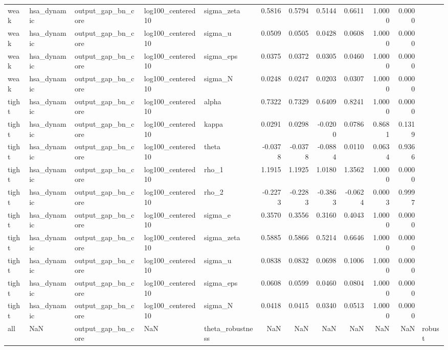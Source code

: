 \begin{tabular}{lllllrrrrrrl}
weak & hsa\_dynamic & output\_gap\_bn\_core & log100\_centered10 & sigma\_zeta & 0.5816 & 0.5794 & 0.5144 & 0.6611 & 1.0000 & 0.0000 &  \\
weak & hsa\_dynamic & output\_gap\_bn\_core & log100\_centered10 & sigma\_u & 0.0509 & 0.0505 & 0.0428 & 0.0608 & 1.0000 & 0.0000 &  \\
weak & hsa\_dynamic & output\_gap\_bn\_core & log100\_centered10 & sigma\_eps & 0.0375 & 0.0372 & 0.0305 & 0.0460 & 1.0000 & 0.0000 &  \\
weak & hsa\_dynamic & output\_gap\_bn\_core & log100\_centered10 & sigma\_N & 0.0248 & 0.0247 & 0.0203 & 0.0307 & 1.0000 & 0.0000 &  \\
tight & hsa\_dynamic & output\_gap\_bn\_core & log100\_centered10 & alpha & 0.7322 & 0.7329 & 0.6409 & 0.8241 & 1.0000 & 0.0000 &  \\
tight & hsa\_dynamic & output\_gap\_bn\_core & log100\_centered10 & kappa & 0.0291 & 0.0298 & -0.0200 & 0.0786 & 0.8681 & 0.1319 &  \\
tight & hsa\_dynamic & output\_gap\_bn\_core & log100\_centered10 & theta & -0.0378 & -0.0378 & -0.0884 & 0.0110 & 0.0634 & 0.9366 &  \\
tight & hsa\_dynamic & output\_gap\_bn\_core & log100\_centered10 & rho\_1 & 1.1915 & 1.1925 & 1.0180 & 1.3562 & 1.0000 & 0.0000 &  \\
tight & hsa\_dynamic & output\_gap\_bn\_core & log100\_centered10 & rho\_2 & -0.2273 & -0.2283 & -0.3863 & -0.0624 & 0.0003 & 0.9997 &  \\
tight & hsa\_dynamic & output\_gap\_bn\_core & log100\_centered10 & sigma\_e & 0.3570 & 0.3556 & 0.3160 & 0.4043 & 1.0000 & 0.0000 &  \\
tight & hsa\_dynamic & output\_gap\_bn\_core & log100\_centered10 & sigma\_zeta & 0.5885 & 0.5866 & 0.5214 & 0.6646 & 1.0000 & 0.0000 &  \\
tight & hsa\_dynamic & output\_gap\_bn\_core & log100\_centered10 & sigma\_u & 0.0838 & 0.0832 & 0.0698 & 0.1006 & 1.0000 & 0.0000 &  \\
tight & hsa\_dynamic & output\_gap\_bn\_core & log100\_centered10 & sigma\_eps & 0.0608 & 0.0599 & 0.0460 & 0.0804 & 1.0000 & 0.0000 &  \\
tight & hsa\_dynamic & output\_gap\_bn\_core & log100\_centered10 & sigma\_N & 0.0418 & 0.0415 & 0.0340 & 0.0513 & 1.0000 & 0.0000 &  \\
all & NaN & output\_gap\_bn\_core & NaN & theta\_robustness & NaN & NaN & NaN & NaN & NaN & NaN & robust \\

\end{tabular}
